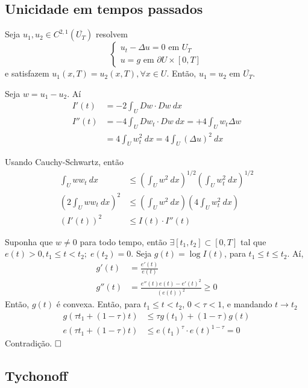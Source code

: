 \documentclass[11pt]{article}
\newcommand{\qed}{$\hfill\square$}
\newcommand{\p}{\partial}
\begin{document}
\subsection{Unicidade em tempos passados}

Seja \( u_1, u_2 \in C^{2,1}(\overline{U_T}) \) resolvem \[ \begin{cases}
	u_t - \Delta u =0 \text{ em } U_T\\
	u = g \text{ em } \p U \times [0,T]
\end{cases} \]
e satisfazem \( u_1(x,T) = u_2(x,T), \forall x \in U \). Então, \( u_1=u_2  \) em \( \overline{U_T} \).

Seja \( w = u_1 - u_2 \). Aí \begin{align*}
	I'(t) &= - 2 \int_U Dw \cdot Dw\ dx \\
	I''(t) &= -4 \int_U Dw_t \cdot Dw\ dx = +4 \int_U w_t \Delta w\\ &= 4 \int_U w_t^2\ dx = 4 \int_U(\Delta u)^2\ dx
\end{align*}

Usando Cauchy-Schwartz, então \begin{align*}
	\int_U w w_t\ dx &\leq \left( \int_U w^2\ dx\right)^{1/2} \left(\int_U w_t^2\ dx \right)^{1/2}\\
	\left(2\int_U w w_t\ dx\right)^2 &\leq \left( \int_U w^2\ dx\right) \left(4\int_U w_t^2\ dx \right) \\
	( I'(t))^2 &\leq I(t) \cdot I''(t)
\end{align*}

Suponha que \( w \neq 0 \) para todo tempo, então \( \exists [t_1,t_2]\subset [0,T] \) tal que \( e(t)>0, t_1 \leq t < t_2; \; e(t_2)=0 \).
Seja \( g(t) = \log I(t) \), para \( t_1 \leq t \leq t_2 \). Aí, \begin{align*}
	g'(t) &= \frac{e'(t)}{e(t)} \\
	g''(t) &= \frac{e''(t)e(t) - e'(t)^2}{(e(t))^2} \geq 0 
\end{align*}
Então, \( g(t) \) é convexa. Então, para \( t_1 \leq t < t_2 \), \( 0 < \tau < 1 \), e mandando \( t \rightarrow t_2 \) \begin{align*}
	g(\tau t_1  + (1 - \tau)t) &\leq \tau g(t_1) + (1-\tau)g(t) \\
	e(\tau t_1  + (1 - \tau)t) &\leq e(t_1)^\tau \cdot e(t)^{1-\tau} =0 
\end{align*}
Contradição. \qed 




\subsection{Tychonoff}
\end{document}
